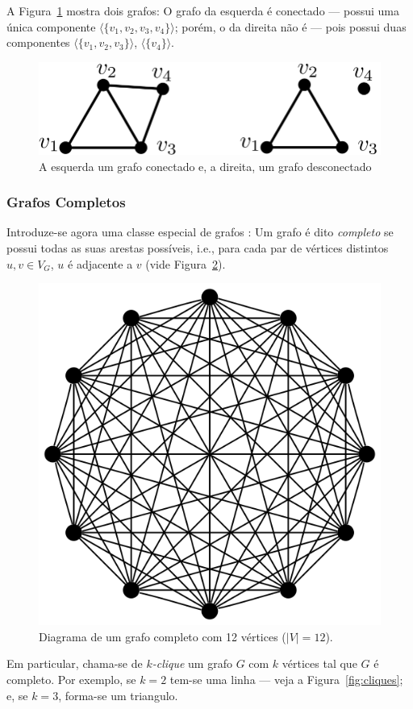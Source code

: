 \documentclass[a4paper,12pt]{article}
\begin{document}
A Figura~\ref{fig:connectGraph} mostra dois grafos: O grafo da esquerda é conectado --- possui uma única componente $\langle \{v_1,v_2,v_3,v_4\}\rangle$; porém, o da direita não é --- pois possui duas componentes $\langle \{v_1,v_2,v_3\}\rangle$, $\langle \{v_4\}\rangle$.

\begin{figure}[H]
	\begin{center}
		\includegraphics[width=0.6\linewidth]{figures/connectedGraph.png}
	\end{center}
	\caption{A esquerda um grafo conectado e, a direita, um grafo desconectado}
	\label{fig:connectGraph}
\end{figure}


\subsubsection{Grafos Completos}

Introduze-se agora uma classe especial de grafos \cite{graphTheoryApplicationsBondy}: Um grafo é dito \textit{completo} se possui todas as suas arestas possíveis, i.e., para cada par de vértices distintos $u, v \in V_G$, $u$ é adjacente a $v$ (vide Figura~\ref{fig:grafocompleto}).

\begin{figure}[H]
	\begin{center}
		\includegraphics[width=0.4\linewidth]{figures/grafocompleto.png}
	\end{center}
	\caption{Diagrama de um grafo completo com 12 vértices ($|V| = 12$).}
	\label{fig:grafocompleto}
\end{figure}

Em particular, chama-se de \textit{$k$-clique} um grafo $G$ com $k$ vértices tal que $G$ é completo. Por exemplo, se $k=2$ tem-se uma linha --- veja a Figura~\ref{fig:cliques}; e, se $k=3$, forma-se um triangulo.
\end{document}
